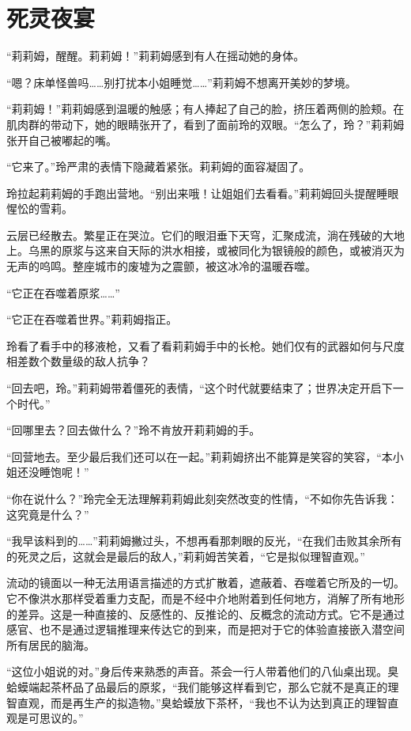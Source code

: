 \chapter{死灵夜宴}

“莉莉姆，醒醒。莉莉姆！”莉莉姆感到有人在摇动她的身体。

“嗯？床单怪兽吗……别打扰本小姐睡觉……”莉莉姆不想离开美妙的梦境。

“莉莉姆！”莉莉姆感到温暖的触感；有人捧起了自己的脸，挤压着两侧的脸颊。在肌肉群的带动下，她的眼睛张开了，看到了面前玲的双眼。“怎么了，玲？”莉莉姆张开自己被嘟起的嘴。

“它来了。”玲严肃的表情下隐藏着紧张。莉莉姆的面容凝固了。

玲拉起莉莉姆的手跑出营地。“别出来哦！让姐姐们去看看。”莉莉姆回头提醒睡眼惺忪的雪莉。

云层已经散去。繁星正在哭泣。它们的眼泪垂下天穹，汇聚成流，淌在残破的大地上。乌黑的原浆与这来自天际的洪水相接，或被同化为银镜般的颜色，或被消灭为无声的呜鸣。整座城市的废墟为之震颤，被这冰冷的温暖吞噬。

“它正在吞噬着原浆……”

“它正在吞噬着世界。”莉莉姆指正。

玲看了看手中的移液枪，又看了看莉莉姆手中的长枪。她们仅有的武器如何与尺度相差数个数量级的敌人抗争？

“回去吧，玲。”莉莉姆带着僵死的表情，“这个时代就要结束了；世界决定开启下一个时代。”

“回哪里去？回去做什么？”玲不肯放开莉莉姆的手。

“回营地去。至少最后我们还可以在一起。”莉莉姆挤出不能算是笑容的笑容，“本小姐还没睡饱呢！”

“你在说什么？”玲完全无法理解莉莉姆此刻突然改变的性情，“不如你先告诉我：这究竟是什么？”

“我早该料到的……”莉莉姆撇过头，不想再看那刺眼的反光，“在我们击败其余所有的死灵之后，这就会是最后的敌人，”莉莉姆苦笑着，“它是拟似理智直观。”

流动的镜面以一种无法用语言描述的方式扩散着，遮蔽着、吞噬着它所及的一切。它不像洪水那样受着重力支配，而是不经中介地附着到任何地方，消解了所有地形的差异。这是一种直接的、反感性的、反推论的、反概念的流动方式。它不是通过感官、也不是通过逻辑推理来传达它的到来，而是把对于它的体验直接嵌入潜空间所有居民的脑海。

“这位小姐说的对。”身后传来熟悉的声音。茶会一行人带着他们的八仙桌出现。臭蛤蟆端起茶杯品了品最后的原浆，“我们能够这样看到它，那么它就不是真正的理智直观，而是再生产的拟造物。”臭蛤蟆放下茶杯，“我也不认为达到真正的理智直观是可思议的。”

